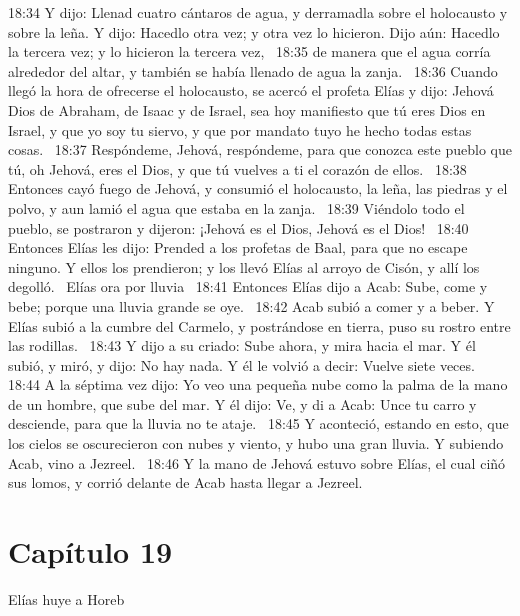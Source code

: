 18:34 Y dijo: Llenad cuatro cántaros de agua, y derramadla sobre el holocausto y sobre la leña. Y dijo: Hacedlo otra vez; y otra vez lo hicieron. Dijo aún: Hacedlo la tercera vez; y lo hicieron la tercera vez,  
18:35 de manera que el agua corría alrededor del altar, y también se había llenado de agua la zanja.  
18:36 Cuando llegó la hora de ofrecerse el holocausto, se acercó el profeta Elías y dijo: Jehová Dios de Abraham, de Isaac y de Israel, sea hoy manifiesto que tú eres Dios en Israel, y que yo soy tu siervo, y que por mandato tuyo he hecho todas estas cosas.  
18:37 Respóndeme, Jehová, respóndeme, para que conozca este pueblo que tú, oh Jehová, eres el Dios, y que tú vuelves a ti el corazón de ellos.  
18:38 Entonces cayó fuego de Jehová, y consumió el holocausto, la leña, las piedras y el polvo, y aun lamió el agua que estaba en la zanja.  
18:39 Viéndolo todo el pueblo, se postraron y dijeron: ¡Jehová es el Dios, Jehová es el Dios!  
18:40 Entonces Elías les dijo: Prended a los profetas de Baal, para que no escape ninguno. Y ellos los prendieron; y los llevó Elías al arroyo de Cisón, y allí los degolló.  
Elías ora por lluvia  
18:41 Entonces Elías dijo a Acab: Sube, come y bebe; porque una lluvia grande se oye.  
18:42 Acab subió a comer y a beber. Y Elías subió a la cumbre del Carmelo, y postrándose en tierra, puso su rostro entre las rodillas.  
18:43 Y dijo a su criado: Sube ahora, y mira hacia el mar. Y él subió, y miró, y dijo: No hay nada. Y él le volvió a decir: Vuelve siete veces.  
18:44 A la séptima vez dijo: Yo veo una pequeña nube como la palma de la mano de un hombre, que sube del mar. Y él dijo: Ve, y di a Acab: Unce tu carro y desciende, para que la lluvia no te ataje.  
18:45 Y aconteció, estando en esto, que los cielos se oscurecieron con nubes y viento, y hubo una gran lluvia. Y subiendo Acab, vino a Jezreel.  
18:46 Y la mano de Jehová estuvo sobre Elías, el cual ciñó sus lomos, y corrió delante de Acab hasta llegar a Jezreel. 
\section*{Capítulo 19 }
Elías huye a Horeb  

